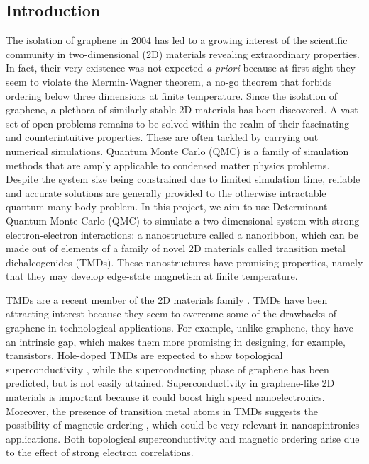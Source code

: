 \documentclass[a0,portrait]{a0poster}
\begin{document}
\begin{multicols}{3}  %

\section{Introduction \label{intro}}

The isolation of graphene in 2004 has led to a growing interest of the scientific community in two-dimensional (2D) materials revealing extraordinary properties. In fact, their very existence was not expected \emph{a priori} because at first sight they seem to violate the Mermin-Wagner theorem, a no-go theorem that forbids ordering below three dimensions at finite temperature.  Since the isolation of graphene, a plethora of similarly stable 2D materials has been discovered. A vast set of open problems remains to be solved within the realm of their fascinating and counterintuitive properties. These are often tackled by carrying out numerical simulations. Quantum Monte Carlo (QMC) is a family of simulation methods that are amply applicable to condensed matter physics problems. Despite the system size being constrained due to limited simulation time, reliable and accurate solutions are generally provided to the otherwise intractable quantum many-body problem. In this project, we aim to use Determinant Quantum Monte Carlo (QMC) to simulate a two-dimensional system with strong electron-electron interactions: a nanostructure called a nanoribbon, which can be made out of elements of a family of novel 2D materials called transition metal dichalcogenides (TMDs). These nanostructures have promising properties, namely that they may develop edge-state magnetism at finite temperature.

TMDs are a recent member of the 2D materials family \cite{Manzeli2017}. TMDs have been attracting interest because they seem to overcome some of the drawbacks of graphene in technological applications. For example, unlike graphene, they have an intrinsic gap, which makes them more promising in designing, for example, transistors. Hole-doped TMDs are expected to show topological superconductivity \cite{topological}, while the superconducting phase of graphene has been predicted, but is not easily attained. Superconductivity in graphene-like 2D materials is important because it could boost high speed nanoelectronics. Moreover, the presence of transition metal atoms in TMDs suggests the possibility of magnetic ordering \cite{tmd_magnetism}, which could be very relevant in nanospintronics applications. Both topological superconductivity and magnetic ordering arise due to the effect of strong electron correlations.


\end{multicols}
\end{document}
